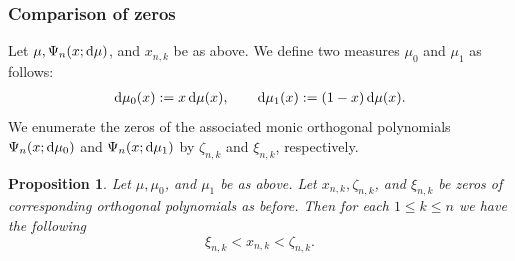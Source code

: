 \documentclass[reqno, a4paper]{amsart}
\renewcommand{\d}{\text{\rm d}}
\theoremstyle{plain}
\newtheorem{proposition}[theorem]{Proposition}
\theoremstyle{definition}
\theoremstyle{remarkstyle}
\numberwithin{equation}{section}
\begin{document}
\subsubsection{Comparison of zeros}
Let $\mu, \Psi_n(x;\d\mu)$, and $x_{n,k}$ be as above. We define two measures $\mu_0 $ and $ \mu_1$ as follows:
\begin{align*}
  \d\mu_0(x) := x\,\d\mu(x),  \qquad   \d\mu_1(x) := (1-x)\,\d\mu(x).
\end{align*}
We enumerate the zeros of the associated monic orthogonal polynomials $\Psi_{n}(x;\d\mu_0)$ and $\Psi_{n}(x;\d\mu_1)$ by $\zeta_{n, k}$ and  $\xi_{n, k}$, respectively.


\begin{proposition}\label{prop:comparison-of-zeros}
    Let $\mu, \mu_0$, and $\mu_1$ be as above. 
    Let $x_{n, k}, \zeta_{n,k}$, and $ \xi_{n, k}$ be zeros of corresponding orthogonal polynomials as before. Then for each $1\leq k\leq n$ we have the following
    \begin{equation}\label{eq:chain-of-inequalities-of-zeros}
        \xi_{n,k} < x_{n,k} < \zeta_{n,k}.
    \end{equation}
  
\end{proposition}
\end{document}
